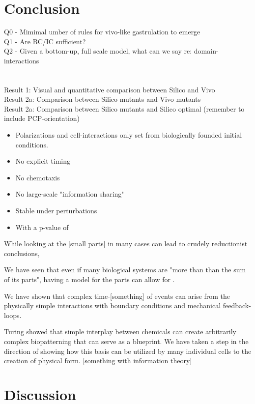 \section{Conclusion}

Q0 - Mimimal umber of rules for vivo-like gastrulation to emerge\\
Q1 - Are BC/IC sufficient?\\
Q2 - Given a bottom-up, full scale model, what can we say re: domain-interactions\\
\\\\
Result 1: Visual and quantitative comparison between Silico and Vivo\\
Result 2a: Comparison between Silico mutants and Vivo mutants\\
Result 2a: Comparison between Silico mutants and Silico optimal (remember to include PCP-orientation)\\


\begin{itemize}
    \item Polarizations and cell-interactions only set from biologically founded initial conditions.
    \item No explicit timing
    \item No chemotaxis
    \item No large-scale "information sharing"
    \item Stable under perturbations
    \item With a p-value of 
\end{itemize}

While looking at the [small parts] in many cases can lead to crudely reductionist conclusions, 

We have seen that even if many biological systems are "more than than the sum of its parts", having a model for the parts can allow for .

We have shown that complex time-[something] of events can arise from the physically simple interactions with boundary conditions and mechanical feedback-loops.

Turing showed that simple interplay between chemicals can create arbitrarily complex biopatterning that can serve as a blueprint. We have taken a step in the direction of showing how this basis can be utilized by many individual cells to the creation of physical form.  [something with information theory] 
\section{Discussion}
